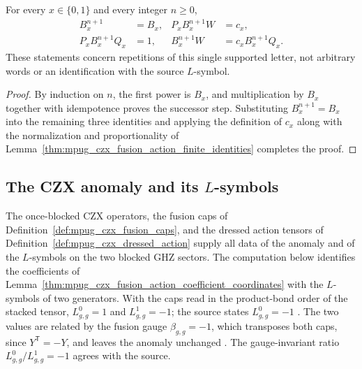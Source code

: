 \begin{lemma}
    \label{thm:mpug_czx_fusion_action_positive_power}
    \leanok
    For every $x\in\{0,1\}$ and every integer $n\geq0$,
    \begin{align}
        B_x^{n+1}       & =B_x, & P_xB_x^{n+1}W & =c_x,             \\
        P_xB_x^{n+1}Q_x & =1,   & B_x^{n+1}W    & =c_xB_x^{n+1}Q_x.
    \end{align}
    These statements concern repetitions of this single supported letter,
    not arbitrary words or an identification with the source $L$-symbol.
\end{lemma}
\begin{proof}\leanok
    By induction on $n$, the first power is $B_x$, and multiplication by
    $B_x$ together with idempotence proves the successor step.
    Substituting $B_x^{n+1}=B_x$ into the remaining three identities and
    applying the definition of $c_x$ along with the normalization and
    proportionality of
    Lemma~\ref{thm:mpug_czx_fusion_action_finite_identities} completes
    the proof.
\end{proof}
\subsection{The CZX anomaly and its \texorpdfstring{$L$}{L}-symbols}

The once-blocked CZX operators, the fusion caps of
Definition~\ref{def:mpug_czx_fusion_caps}, and the dressed action tensors of
Definition~\ref{def:mpug_czx_dressed_action} supply all data of the anomaly and
of the $L$-symbols on the two blocked GHZ sectors. The computation below
identifies the coefficients of
Lemma~\ref{thm:mpug_czx_fusion_action_coefficient_coordinates} with the
$L$-symbols of two generators. With the caps read in the product-bond order of
the stacked tensor, $L^0_{g,g}=1$ and $L^1_{g,g}=-1$; the source states
$L^0_{g,g}=-1$ \cite[line~4699]{FrancoRubio2025MPUGauging}. The two values are
related by the fusion gauge $\beta_{g,g}=-1$, which transposes both caps, since
$Y^{\mathsf T}=-Y$, and leaves the anomaly unchanged
\cite{gap:fbc25_czx_fusion_coordinate_compatibility}. The gauge-invariant ratio
$L^0_{g,g}/L^1_{g,g}=-1$ agrees with the source.

